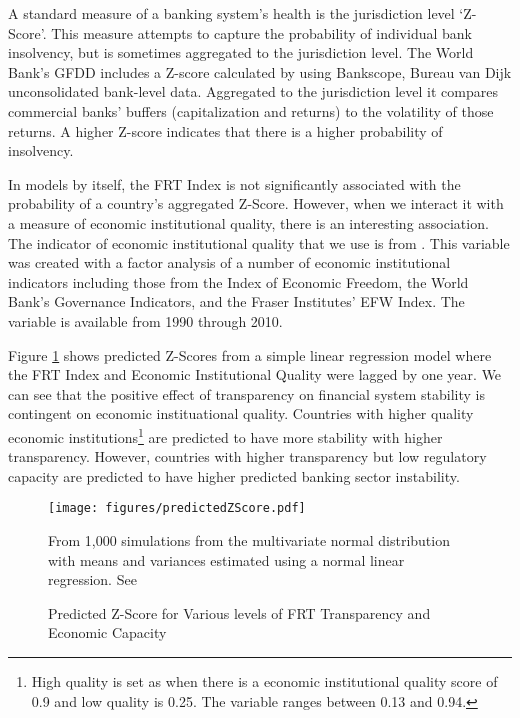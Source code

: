 \documentclass[a4paper]{article}
\begin{document}
A standard measure of a banking system's health is the jurisdiction level `Z-Score'. This measure attempts to capture the probability of individual bank insolvency, but is sometimes aggregated to the jurisdiction level. The World Bank's GFDD includes a Z-score calculated by using Bankscope, Bureau van Dijk unconsolidated bank-level data. Aggregated to the jurisdiction level it compares commercial banks' buffers (capitalization and returns) to the volatility of those returns. A higher Z-score indicates that there is a higher probability of insolvency.

In models by itself, the FRT Index is not significantly associated with the probability of a country's aggregated Z-Score. However, when we interact it with a measure of economic institutional quality, there is an interesting association. The indicator of economic institutional quality that we use is from \cite{kunvcivc2014}. This variable was created with a factor analysis of a number of economic institutional indicators including those from the Index of Economic Freedom, the World Bank’s Governance Indicators, and the Fraser Institutes’ EFW Index. The variable is available from 1990 through 2010.

Figure \ref{basicAssoc} shows predicted Z-Scores from a simple linear regression model where the FRT Index and Economic Institutional Quality were lagged by one year. We can see that the positive effect of transparency on financial system stability is contingent on economic instituational quality. Countries with higher quality economic institutions\footnote{High quality is set as when there is a economic institutional quality score of 0.9 and low quality is 0.25. The variable ranges between 0.13 and 0.94.} are predicted to have more stability with higher transparency. However, countries with higher transparency but low regulatory capacity are predicted to have higher predicted banking sector instability.

\begin{figure}
    \caption{Predicted Z-Score for Various levels of FRT Transparency and Economic Capacity}
    \label{basicAssoc}
    \begin{center}
        \texttt{[image: figures/predictedZScore.pdf]}
    \end{center}
    {\scriptsize{From 1,000 simulations from the multivariate normal distribution with means and variances estimated using a normal linear regression. See \cite{King2000,simPH_JSS}}}
\end{figure}
\end{document}
